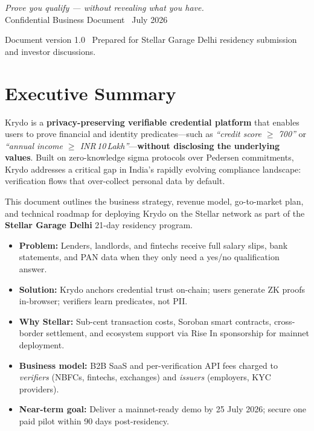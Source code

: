 \documentclass[11pt,a4paper]{article}
\newcommand{\krydo}{\textsf{Krydo}}
\newcommand{\stellar}{\textsf{Stellar}}
\newcommand{\highlight}[1]{\textbf{\color{StellarDark}#1}}
\begin{document}
\begin{titlepage}
\begin{center}
    \vspace{2.2cm}

    {\large\color{BodyGray}
      \textit{Prove you qualify --- without revealing what you have.}\\[0.8em]
      Confidential Business Document \textbar\ July 2026
    }
  \end{center}

  \vfill
  {\small\color{BodyGray}
    Document version 1.0 \textbar\
    Prepared for Stellar Garage Delhi residency submission and investor discussions.
  }
\end{titlepage}

\tableofcontents
\newpage

\section{Executive Summary}

\krydo{} is a \highlight{privacy-preserving verifiable credential platform} that enables users to prove financial and identity predicates---such as \emph{``credit score $\geq$ 700''} or \emph{``annual income $\geq$ INR\,10\,Lakh''}---\textbf{without disclosing the underlying values}. Built on zero-knowledge sigma protocols over Pedersen commitments, \krydo{} addresses a critical gap in India's rapidly evolving compliance landscape: verification flows that over-collect personal data by default.

This document outlines the business strategy, revenue model, go-to-market plan, and technical roadmap for deploying \krydo{} on the \stellar{} network as part of the \textbf{Stellar Garage Delhi} 21-day residency program.

\begin{keybox}
  \begin{itemize}
    \item \textbf{Problem:} Lenders, landlords, and fintechs receive full salary slips, bank statements, and PAN data when they only need a yes/no qualification answer.
    \item \textbf{Solution:} \krydo{} anchors credential trust on-chain; users generate ZK proofs in-browser; verifiers learn predicates, not PII.
    \item \textbf{Why \stellar{}:} Sub-cent transaction costs, Soroban smart contracts, cross-border settlement, and ecosystem support via Rise In sponsorship for mainnet deployment.
    \item \textbf{Business model:} B2B SaaS and per-verification API fees charged to \emph{verifiers} (NBFCs, fintechs, exchanges) and \emph{issuers} (employers, KYC providers).
    \item \textbf{Near-term goal:} Deliver a mainnet-ready demo by 25 July 2026; secure one paid pilot within 90 days post-residency.
  \end{itemize}
\end{keybox}
\end{document}
